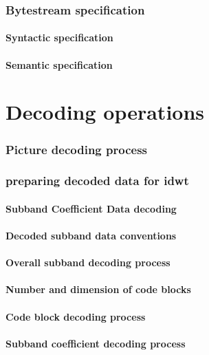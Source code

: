 \clearpage
\section{Bytestream specification}
\subsection{Syntactic specification}
\subsection{Semantic specification}

\clearpage

\part{Decoding operations}

\section{Picture decoding process}

\section{preparing decoded data for idwt}
\subsection{Subband Coefficient Data decoding}
\subsection{Decoded subband data conventions}
\subsection{Overall subband decoding process}
\subsection{Number and dimension of code blocks}
\subsection{Code block decoding process}
\subsection{Subband coefficient decoding process}
